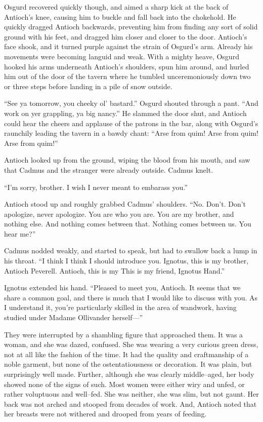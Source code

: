 Osgurd recovered quickly though, and aimed a sharp kick at the back of Antioch’s knee, causing him to buckle and fall back into the chokehold. He quickly dragged Antioch backwards, preventing him from finding any sort of solid ground with his feet, and dragged him closer and closer to the door. Antioch’s face shook, and it turned purple against the strain of Osgurd’s arm. Already his movements were becoming languid and weak. With a mighty heave, Osgurd hooked his arms underneath Antioch’s shoulders, spun him around, and hurled him out of the door of the tavern where he tumbled unceremoniously down two or three steps before landing in a pile of snow outside.

“See ya tomorrow, you cheeky ol’ bastard.” Osgurd shouted through a pant. “And work on yer grappling, ya big nancy.” He slammed the door shut, and Antioch could hear the cheers and applause of the patrons in the bar, along with Osgurd’s raunchily leading the tavern in a bawdy chant: “Arse from quim! Arse from quim! Arse from quim!”

Antioch looked up from the ground, wiping the blood from his mouth, and saw that Cadmus and the stranger were already outside. Cadmus knelt.

“I’m sorry, brother. I wish{\el} I never meant to embarass you.”

Antioch stood up and roughly grabbed Cadmus’ shoulders. “No. Don’t. Don’t apologize, never apologize. You are who you are. You are my brother, and nothing else. And nothing comes between that. Nothing comes between us. You hear me?”

Cadmus nodded weakly, and started to speak, but had to swallow back a lump in his throat. “I think{\el} I think I should introduce you. Ignotus, this is my brother, Antioch Peverell. Antioch, this is my{\el} This is my friend, Ignotus Hand.”

Ignotus extended his hand. “Pleased to meet you, Antioch. It seems that we share a common goal, and there is much that I would like to discuss with you. As I understand it, you’re particularly skilled in the area of wandwork, having studied under Madame Ollivander herself\mbox{---}”

They were interrupted by a shambling figure that approached them. It was a woman, and she was dazed, confused. She was wearing a very curious green dress, not at all like the fashion of the time. It had the quality and craftmanship of a noble garment, but none of the ostentatiousness or decoration. It was plain, but surprisingly well made. Further, although she was clearly middle\mbox{--}aged, her body showed none of the signs of such. Most women were either wiry and unfed, or rather voluptuous and well\mbox{--}fed. She was neither, she was slim, but not gaunt. Her back was not arched and stooped from decades of work. And, Antioch noted that her breasts were not withered and drooped from years of feeding.


